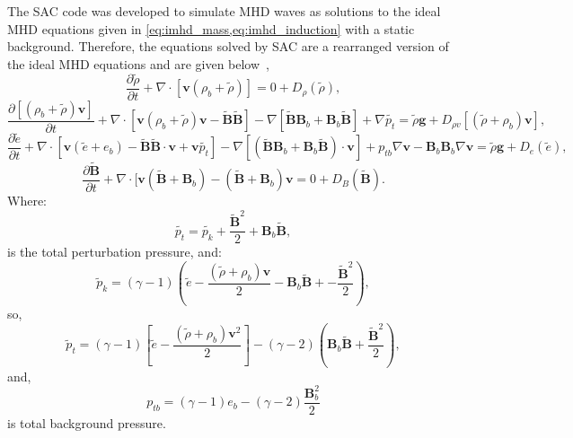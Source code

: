 The SAC code was developed to simulate MHD waves as solutions to the ideal MHD equations given in \cref{eq:imhd_mass,eq:imhd_induction} with a static background.
Therefore, the equations solved by SAC are a rearranged version of the ideal MHD equations and are given below~\citep[taken from][]{shelyag2008},
\begin{equation}
\frac{\partial\tilde{\rho}}{\partial t}+\nabla\cdot[\mathbf{v}(\rho_{b}+\tilde{\rho})]=0+D_{\rho}(\tilde{\rho}),
\end{equation}
\begin{equation}
\frac{\partial[(\rho_{b}+\tilde{\rho})\mathbf{v}]}{\partial t}+\nabla\cdot[\mathbf{v}(\rho_{b}+\tilde{\rho})\mathbf{v}-\mathbf{\tilde{B}\tilde{B}}]-\nabla[\mathbf{\tilde{B}}\mathbf{B}_{b}+\mathbf{B}_{b}\mathbf{\tilde{B}}]+\nabla\tilde{p_{t}}=\tilde{\rho}\mathbf{g}+D_{\rho v}[(\tilde{\rho}+\rho_{b})\mathbf{v}],
\end{equation}
\begin{equation}
\frac{\partial\tilde{e}}{\partial t}+\nabla\cdot[\mathbf{v}(\tilde{e}+e_{b})-\mathbf{\tilde{B}\tilde{B}}\cdot\mathbf{v}+\mathbf{v}\tilde{p_{t}}]-\nabla[(\mathbf{\tilde{B}B}_{b}+\mathbf{B}_{b}\mathbf{\tilde{B}})\cdot\mathbf{v}]+p_{tb}\nabla\mathbf{v}-\mathbf{B}_{b}\mathbf{B}_{b}\nabla\mathbf{v}=\tilde{\rho}\mathbf{g}+D_{e}(\tilde{e}),
\end{equation}
\begin{equation}
\frac{\partial\mathbf{\tilde{B}}}{\partial t}+\nabla\cdot[\mathbf{v}(\mathbf{\tilde{B}}+\mathbf{B}_{b})-(\mathbf{\tilde{B}}+\mathbf{B}_{b})\mathbf{v}=0+D_{B}(\mathbf{\tilde{B}}).
\end{equation}
Where:
\begin{equation}
\tilde{p_{t}}=\tilde{p_{k}}+\frac{\tilde{\mathbf{B}}^{2}}{2}+\mathbf{B}_{b}\mathbf{\tilde{B}},
\end{equation}
is the total perturbation pressure, and: 
\begin{equation}
\tilde{p}_{k}=(\gamma-1)\left(\tilde{e}-\frac{(\tilde{\rho}+\rho_{b})\mathbf{v}}{2}-\mathbf{B}_b\mathbf{\tilde{B}}+-\frac{\tilde{\mathbf{B}}^{2}}{2}\right),
\end{equation}
so,
\begin{equation}
\tilde{p}_{t}=(\gamma-1)\left[\tilde{e}-\frac{(\tilde{\rho}+\rho_{b})\mathbf{v}^{2}}{2}\right]-(\gamma-2)\left(\mathbf{B}_{b}\mathbf{\tilde{B}}+\frac{\tilde{\mathbf{B}}^{2}}{2}\right),
\end{equation}
and,
\begin{equation}
p_{tb}=(\gamma-1)e_{b}-(\gamma-2)\frac{\mathbf{B}_{b}^{2}}{2}
\end{equation}
is total background pressure.

